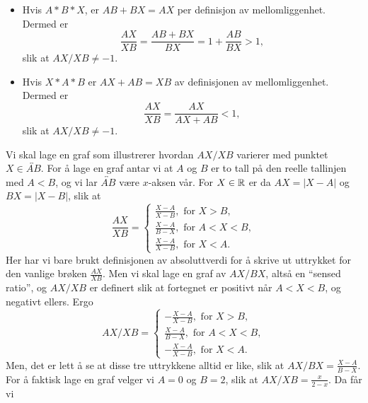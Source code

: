 \begin{oppgave}[5.6.14]
\begin{punkt}
\begin{itemize}
            \item Hvis $A \ast B \ast X$, er $AB + BX = AX$ per definisjon av mellomliggenhet.
            Dermed er 
            $$\frac{AX}{XB}=\frac{AB+BX}{BX}=1+\frac{AB}{BX}>1,$$
            slik at $AX/XB \neq -1$.

            \item Hvis $X \ast A \ast B$ er $AX + AB = XB$ av definisjonen av mellomliggenhet.
            Dermed er
            $$\frac{AX}{XB}=\frac{AX}{AX+AB}<1,$$
            slik at $AX/XB \neq -1$.
        \end{itemize}
    \end{punkt}

    \begin{punkt}
        Vi skal lage en graf som illustrerer hvordan $AX/XB$ varierer med punktet $X\in \overleftrightarrow{AB}$. 
        For å lage en graf antar vi at $A$ og $B$ er to tall på den reelle tallinjen med $A<B$, og vi lar $\overleftrightarrow{AB}$ være $x$-aksen vår. 
        For $X\in \mathbb{R}$ er da $AX=|X-A|$ og $BX=|X-B|$, slik at 
        $$
        \frac{AX}{XB}=
        \begin{cases}
            \frac{X-A}{X-B}, \text{ for } X>B, \\
            \frac{X-A}{B-X}, \text{ for } A<X<B, \\
            \frac{X-A}{X-B}, \text{ for } X<A.
        \end{cases}
        $$
        Her har vi bare brukt definisjonen av absoluttverdi for å skrive ut uttrykket for den vanlige brøken $\frac{AX}{XB}$. 
        Men vi skal lage en graf av $AX/BX$, altså en ``sensed ratio'', og $AX/XB$ er definert slik at fortegnet er positivt når $A < X < B$, og negativt ellers. 
        Ergo
        $$
        AX/XB=
        \begin{cases}
            -\frac{X-A}{X-B}, \text{ for } X>B, \\
            \frac{X-A}{B-X}, \text{ for } A<X<B, \\
            -\frac{X-A}{X-B}, \text{ for } X<A.
        \end{cases}
        $$
        Men, det er lett å se at disse tre uttrykkene alltid er like, slik at $AX/BX=\frac{X-A}{B-X}$.
        For å faktisk lage en graf velger vi $A=0$ og $B=2$, slik at $AX/XB=\frac{x}{2-x}$. 
        Da får vi 

        \begin{figure}[H]
           \centering
             
        \end{figure}
    \end{punkt}
\end{oppgave}

